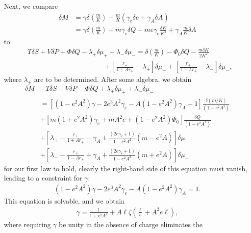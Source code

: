 \documentclass[
twoside,
openright,
frontopenright,
]{dmathesis}
\newcommand{\nn}{\nonumber}
\begin{document}
Next, we compare
\begin{align}
\delta M &= \gamma \delta \left ( \frac{m}{K} \right ) 
+ \frac{m}{K} (\gamma_e \delta e + \gamma_A \delta A)
\nn\\&= \gamma \delta \left ( \frac{m}{K} \right ) 
+ m \gamma_e \delta Q + m e \gamma_e \frac{\delta K}{K^2}
+ \gamma_A \frac{m}{K} \delta A
\end{align}
to
\begin{align}
&T \delta S + V \delta P + \Phi \delta Q -\lambda_+ \delta \mu_+ - \lambda_-\delta \mu_-
= \delta \left ( \frac{m}{K} \right ) 
- \Phi_0 \delta Q - \frac{m\delta K}{2K^2}\nn\\
&\hspace{11em} + \left [ \frac{r_+}{1+Ar_+} - \lambda _+ \right]\delta \mu_+
+ \left [ \frac{r_+}{1-Ar_+} - \lambda _- \right]\delta \mu_-,
\end{align}
where $\lambda_\pm$ are to be determined. After some
algebra, we obtain
\begin{align}
  \label{eq:firstlawder1}
  \delta M &- T \delta S - V \delta P - \Phi \delta Q + \lambda_+ \delta \mu_+ +
             \lambda_-\delta \mu_-\nn\\
           &= \left [ (1-e^2 A^2) \gamma-2 e^3A^2 \gamma_e -
             A(1-e^2 A^2) \gamma_A -1 \right] \frac{ \delta \left ( {m/K} \right )
             }{(1-e^2A^2)} \nn\\
           &+ \left [ m (1+e^2 A^2) \gamma_e + mA^2 e +(1-e^2 A^2)
             \Phi_0 \right] \frac{ \delta Q }{(1-e^2A^2) }\nn\\
           &+ \left [ \lambda_+ -\frac{r_+}{1+Ar_+} - \gamma_A +
             \frac{(2e\gamma_e+1)}{1-e^2 A^2} \left ( m - e^2A \right) \right]
             \delta \mu_+\nn\\
           &+ \left [ \lambda_- - \frac{r_+}{1-Ar_+} + \gamma_A
             +\frac{(2e\gamma_e+1)}{1-e^2 A^2} \left ( m + e^2A \right) \right]
             \delta \mu_- 
\end{align}
for our first law to hold, clearly the right-hand side of this equation must
vanish, leading to a constraint for $\gamma$:
\begin{align}
(1-e^2 A^2) \gamma-2 e^3A^2 \gamma_e - A(1-e^2 A^2) \gamma_A =1.
\end{align}
This equation is solvable, and we obtain
\begin{align}
  \gamma = \frac{1}{1+e^2 A^2} + A\ell \zeta\left(\frac{\ell}{e}+A^2e \ell\right),
\end{align}
where requiring $\gamma$ be unity in the absence of charge eliminates the
\end{document}
